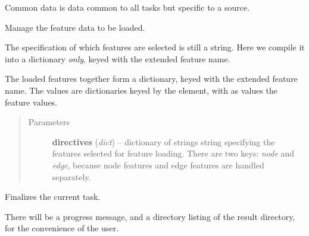 \documentclass[letterpaper,10pt,english]{sphinxmanual}
\begin{document}
\begin{fulllineitems}
\begin{fulllineitems}
Common data is data  common to all tasks but specific to a source.

\end{fulllineitems}


\begin{fulllineitems}
\label{graf/graf:graf.GrafTask.compile}
\end{fulllineitems}


\begin{fulllineitems}
\label{graf/graf:graf.GrafTask.feature_loader}
Manage the feature data to be loaded.

The specification of which features are selected is still a string.
Here we compile it into a dictionary \emph{only}, keyed with the extended feature name.

The loaded features together form a dictionary, keyed with the extended feature name.
The values are dictionaries keyed by the element, with as values the feature values.
\begin{quote}\begin{description}
\item[{Parameters}] \leavevmode
\textbf{directives} (\emph{dict}) --
dictionary of strings string specifying the features selected for feature loading.
There are two keys: \emph{node} and \emph{edge}, because node features and edge features are handled separately.

\end{description}\end{quote}

\end{fulllineitems}


\begin{fulllineitems}
\label{graf/graf:graf.GrafTask.finish_task}
Finalizes the current task.

There will be a progress message, and a directory listing of the result directory,
for the convenience of the user.

\end{fulllineitems}



\end{fulllineitems}
\end{document}
